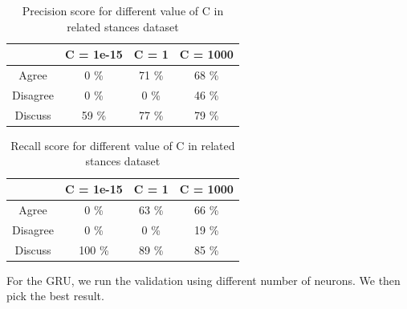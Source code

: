 \documentclass[11.5pt]{article}
\begin{document}
\begin{table}[h!]
  \centering
  \begin{tabular} 
    {|c|c|c|c|}
    \hline
     & C = 1e-15 & C = 1 & C = 1000 \\
    \hline
    Agree & 0 \% & 71 \% & 68 \% \\
    \hline
    Disagree & 0 \% & 0 \% & 46 \% \\
    \hline
    Discuss & 59 \% & 77 \% & 79 \% \\
    \hline
  \end{tabular}
  \caption{Precision score for different value of C in related stances dataset}
\end{table}

\begin{table}[h!]
  \centering
  \begin{tabular} 
    {|c|c|c|c|}
    \hline
     & C = 1e-15 & C = 1 & C = 1000 \\
    \hline
    Agree & 0 \% & 63 \% & 66 \% \\
    \hline
    Disagree & 0 \% & 0 \% & 19 \% \\
    \hline
    Discuss & 100 \% & 89 \% & 85 \% \\
    \hline
  \end{tabular}
  \caption{Recall score for different value of C in related stances dataset}
\end{table}

For the GRU, we run the validation using different number of neurons. We then pick the best result.
\end{document}
